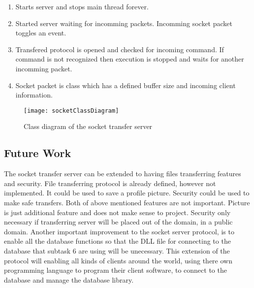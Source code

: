 \begin{enumerate}
	\item Starts server and stops main thread forever.
	\item Started server waiting for incomming packets. Incomming socket packet toggles an event.
	\item Transfered protocol is opened and checked for incoming command. If command is not recognized then execution is stopped and waits for another incomming packet.
	\item Socket packet is class which has a defined buffer size and incoming client information.
\end{enumerate}

\begin{figure}[h]
	\centering
		\texttt{[image: socketClassDiagram]}
	\caption{Class diagram of the socket transfer server}
	\label{fig:socketClassDiagram}
\end{figure}

\subsection{Future Work}

The socket transfer server can be extended to having files transferring features and security. File transferring protocol is already defined, however not implemented. It could be used to save a profile picture. Security could be used to make safe transfers. Both of above mentioned features are not important. Picture is just additional feature and does not make sense to project. Security only necessary if transferring server will be placed out of the domain, in a public domain. Another important improvement to the socket server protocol, is to enable all the database functions so that the DLL file for connecting to the database that subtask 6 are using will be unecessary. This extension of the protocol will enabling all kinds of clients around the world, using there own programming language to program their client software, to connect to the database and manage the database library.